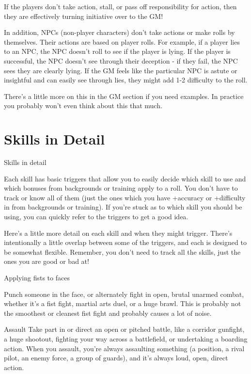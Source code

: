 If the players don’t take action, stall, or pass off responsibility for action, then they are  
effectively turning initiative over to the GM!
 

In addition, NPCs (non-player characters) don’t take actions or make rolls by themselves. Their  
actions are based on player rolls. For example, if a player lies to an NPC, the NPC doesn’t roll to  
see if the player is lying. If the player is successful, the NPC doesn’t see through their deception  
- if they fail, the NPC sees they are clearly lying. If the GM feels like the particular NPC is astute  
or insightful and can easily see through lies, they might add 1-2 difficulty to the roll.
 

There’s a little more on this in the GM section if you need examples. In practice you probably  
won’t even think about this that much.
 
\section{Skills in Detail}
                                               Skills in detail
 

Each skill has basic triggers that allow you to easily decide which skill to use and which  
bonuses from backgrounds or training apply to a roll. You don’t have to track or know all of  
them (just the ones which you have +accuracy or +difficulty in from backgrounds or training). If  
you’re stuck as to which skill you should be using, you can quickly refer to the triggers to get a  
good idea.
 

Here’s a little more detail on each skill and when they might trigger. There’s intentionally a little  
overlap between some of the triggers, and each is designed to be somewhat flexible.  
Remember, you don’t need to track all the skills, just the ones you are good or bad at!
 

Applying fists to faces  

                                                                                                                   


Punch someone in the face, or alternately fight in open, brutal unarmed combat, whether it’s a fist  
fight, martial arts duel, or a huge brawl. This is probably not the smoothest or cleanest fist fight  
and probably causes a lot of noise.  

Assault  
Take part in or direct an open or pitched battle, like a corridor gunfight, a huge shootout, fighting  
your way across a battlefield, or undertaking a boarding action. When you assault, you’re always  
assaulting something (a position, a rival pilot, an enemy force, a group of guards), and it’s always  
loud, open, direct action.  

